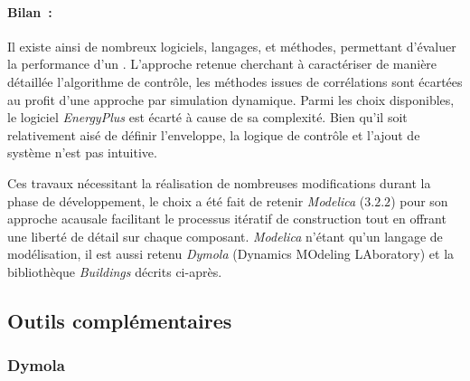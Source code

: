 \paragraph{Bilan~:} %
\label{par:bilan}
Il existe ainsi de nombreux logiciels, langages, et méthodes, permettant d’évaluer la
performance d’un . L’approche retenue cherchant à caractériser de manière
détaillée l’algorithme de contrôle, les méthodes issues de corrélations sont écartées au
profit d’une approche par simulation dynamique. Parmi les choix disponibles, le logiciel
\textit{EnergyPlus} est écarté à cause de sa complexité. Bien qu’il soit relativement aisé
de définir l’enveloppe, la logique de contrôle et l’ajout de système n’est pas intuitive.

Ces travaux nécessitant la réalisation de nombreuses modifications durant la phase de
développement, le choix a été fait de retenir \textit{Modelica} ($3.2.2$) pour son
approche acausale facilitant le processus itératif de construction tout en offrant une
liberté de détail sur chaque composant. \textit{Modelica} n’étant qu’un langage de
modélisation, il est aussi retenu \textit{Dymola} (Dynamics MOdeling LAboratory) et la
bibliothèque \textit{Buildings} décrits ci-après.



\subsection{Outils complémentaires} %
\label{sub:outils_complementaires}
\subsubsection{Dymola} %
\label{ssub:dymola}

